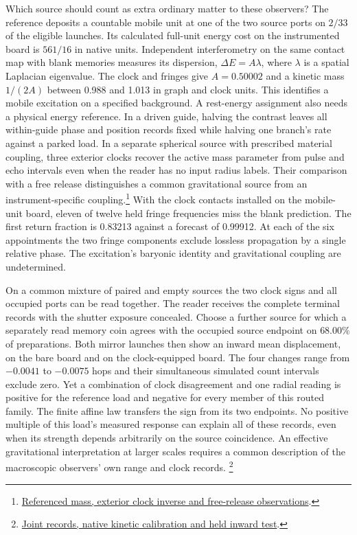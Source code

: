\documentclass[11pt]{article}
\begin{document}
Which source should count as extra ordinary matter to these observers?
The reference deposits a countable mobile unit at one of the two
source ports on $2/33$ of the eligible launches. Its calculated
full-unit energy cost on the instrumented board is $561/16$ in native
units. Independent interferometry on the same contact map with blank
memories measures its dispersion, $\Delta E=A\lambda$, where $\lambda$
is a spatial Laplacian eigenvalue. The clock and fringes give
$A=0.50002$ and a kinetic mass $1/(2A)$ between 0.988 and 1.013
in graph and clock units. This identifies a mobile excitation on a
specified background. A rest-energy assignment also needs a physical
energy reference. In a driven guide, halving the contrast leaves all
within-guide phase and position records fixed while halving one
branch's rate against a parked load. In a separate spherical source
with prescribed material coupling, three exterior clocks recover the
active mass parameter from pulse and echo intervals even when the
reader has no input radius labels. Their comparison with a free
release distinguishes a common gravitational source from an
instrument-specific coupling.\footnote{\href{https://github.com/FloatingPragma/observer-patch-holography/tree/main/code/matched_einstein_limit/record_masses}{Referenced mass, exterior clock inverse and free-release observations}.}
With the clock contacts installed on the mobile-unit board, eleven of
twelve held fringe frequencies miss the blank prediction. The first
return fraction is 0.83213 against a forecast of 0.99912. At each of
the six appointments the two fringe components exclude lossless
propagation by a single relative phase. The excitation's baryonic
identity and gravitational coupling are undetermined.

On a common mixture of paired and empty sources the two clock signs
and all occupied ports can be read together. The reader receives
the complete terminal records with the shutter exposure concealed.
Choose a further source for which a separately read memory coin
agrees with the occupied source endpoint on $68.00\%$ of preparations.
Both mirror launches then show an inward mean displacement, on the
bare board and on the clock-equipped board. The four changes range
from $-0.0041$ to $-0.0075$ hops and their simultaneous simulated
count intervals exclude zero. Yet a combination of clock disagreement
and one radial reading is positive for the reference load and negative
for every member of this routed family. The finite affine law transfers
the sign from its two endpoints. No positive multiple of this load's
measured response can explain all of these records, even when its
strength depends arbitrarily on the source coincidence. An effective
gravitational interpretation at larger scales requires a common
description of the macroscopic observers' own range and clock records.%
\footnote{\href{https://github.com/FloatingPragma/observer-patch-holography/tree/main/model/experiments/interval_echo_shell_flux/product_address/green_response/material_recoil/overlap_source/native_boundary/regional_reference/recovery}{Joint records, native kinetic calibration and held inward test}.}
\end{document}
